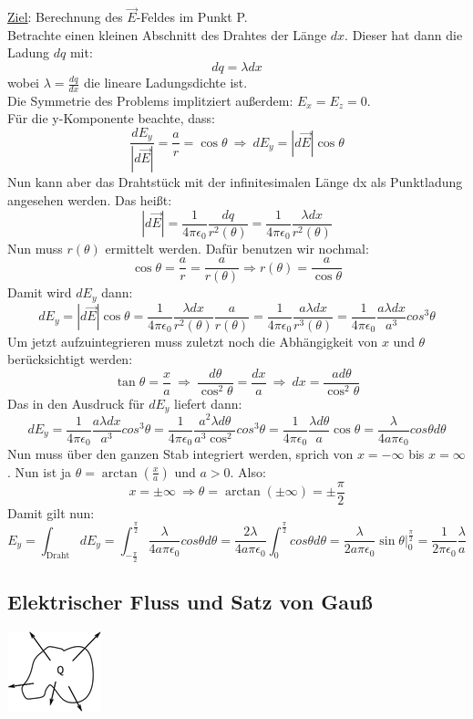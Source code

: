 \documentclass[11pt]{article}
\begin{document}
		\underline{Ziel}: Berechnung des $\vec E$-Feldes im Punkt P.\\
Betrachte einen kleinen Abschnitt des Drahtes der Länge $dx$. Dieser hat dann die Ladung $dq$ mit:
$$dq=\lambda dx$$
wobei $\lambda=\frac{dq}{dx}$ die lineare Ladungsdichte ist.\\
Die Symmetrie des Problems implitziert außerdem: $E_x=E_z=0$.\\
Für die y-Komponente beachte, dass:
$$\frac{dE_y}{|d\vec E|}=\frac{a}{r}=\cos\theta\ \Rightarrow\ dE_y=|d\vec E|\cos\theta$$
Nun kann aber das Drahtstück mit der infinitesimalen Länge dx als Punktladung angesehen werden. Das heißt:
$$|d\vec E|=\frac{1}{4\pi\epsilon_0}\frac{dq}{r^2(\theta)}=\frac{1}{4\pi\epsilon_0}\frac{\lambda dx}{r^2(\theta)}$$
Nun muss $r(\theta)$ ermittelt werden. Dafür benutzen wir nochmal:
$$\cos\theta=\frac{a}{r}=\frac{a}{r(\theta)}\Rightarrow r(\theta)=\frac{a}{\cos\theta}$$
Damit wird $dE_y$ dann:
$$dE_y=|d\vec E|\cos\theta=\frac{1}{4\pi\epsilon_0}\frac{\lambda dx}{r^2(\theta)}\frac{a}{r(\theta)}=
\frac{1}{4\pi\epsilon_0}\frac{a\lambda dx}{r^3(\theta)}=\frac{1}{4\pi\epsilon_0}\frac{a\lambda dx}{a^3}cos^3\theta$$
Um jetzt aufzuintegrieren muss zuletzt noch die Abhängigkeit von $x$ und $\theta$ berücksichtigt werden:
$$\tan\theta=\frac{x}{a}\ \Rightarrow\ \frac{d\theta}{\cos^2\theta}=\frac{dx}{a}\ \Rightarrow\ dx=\frac{ad\theta}{\cos^2\theta}$$
Das in den Ausdruck für $dE_y$ liefert dann:
$$dE_y=\frac{1}{4\pi\epsilon_0}\frac{a\lambda dx}{a^3}cos^3\theta=\frac{1}{4\pi\epsilon_0}\frac{a^2\lambda d\theta}{a^3\cos^2}cos^3\theta=\frac{1}{4\pi\epsilon_0}\frac{\lambda d\theta}{a}\cos\theta=\frac{\lambda}{4a\pi\epsilon_0}cos\theta d\theta$$
Nun muss über den ganzen Stab integriert werden, sprich von $x=-\infty$ bis $x=\infty$. 
Nun ist ja $\theta=\arctan\left(\frac{x}{a}\right)$ und $a>0$. Also:
$$x=\pm\infty\ \Rightarrow \theta=\arctan(\pm\infty)=\pm\frac{\pi}{2}$$
Damit gilt nun:
$$E_y=\int_{\text{Draht}}dE_y=\int_{-\frac{\pi}{2}}^{\frac{\pi}{2}}\frac{\lambda}{4a\pi\epsilon_0}cos\theta d\theta=\frac{2\lambda}{4a\pi\epsilon_0}\int_{0}^{\frac{\pi}{2}}cos\theta d\theta=\frac{\lambda}{2a\pi\epsilon_0}\sin\theta\bigg|_0^\frac{\pi}{2}=\frac{1}{2\pi\epsilon_0}\frac{\lambda}{a}$$

		
	
\subsection{Elektrischer Fluss und Satz von Gauß}

\includegraphics{skizzen/14/14_6B0}
		
\end{document}
